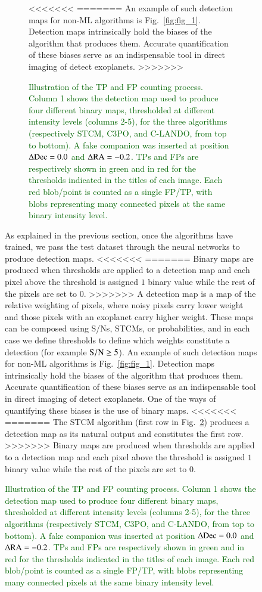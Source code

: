 \documentclass{aa}
\newcommand{\newchange}[1]{\textcolor{darkgreen}{#1}}
\begin{document}
{{{\begin{figure}[t]
\begin{figure}[t]
    \caption{\newchange{Illustration of the TP and FP counting process. Column 1 shows the detection map used to produce four different binary maps, thresholded at different intensity levels (columns 2-5), for the three algorithms (respectively STCM, C3PO, and C-LANDO, from top to bottom). A fake companion was inserted at position $\Delta{\rm Dec}=0.0$ and $\Delta{\rm RA} = -0.2$. TPs and FPs are respectively shown in green and in red for the thresholds indicated in the titles of each image. Each red blob/point is counted as a single FP/TP, with blobs representing many connected pixels at the same binary intensity level.}}
    \label{fig:sample_detmaps}
<<<<<<<
=======
An example of such detection maps for non-ML algorithms is Fig.~\ref{fig:fig_1}.
Detection maps intrinsically hold the biases of the algorithm that produces them. Accurate quantification of these biases serve as an indispensable tool in direct imaging of detect exoplanets.
>>>>>>>
\end{figure}

As explained in the previous section, once the algorithms have trained, we pass the test dataset through the neural networks to produce detection maps.
<<<<<<<
=======
Binary maps are produced when thresholds are applied to a detection map and each pixel above the threshold is assigned $1$ binary value while the rest of the pixels are set to $0$.
>>>>>>>
A detection map is a map of the relative weighting of pixels, where noisy pixels carry lower weight and those pixels with an exoplanet carry higher weight.
These maps can be composed using S/Ns, STCMs, or probabilities, and in each case we define thresholds to define which weights constitute a detection (for example $\rm{S/N}\ge 5$).
An example of such detection maps for non-ML algorithms is Fig.~\ref{fig:fig_1}.
Detection maps intrinsically hold the biases of the algorithm that produces them. Accurate quantification of these biases serve as an indispensable tool in direct imaging of detect exoplanets.
One of the ways of quantifying these biases is the use of  binary maps.
<<<<<<<
=======
The STCM algorithm (first row in Fig.~\ref{fig:sample_detmaps}) produces a detection map as its natural output and constitutes the first row.
>>>>>>>
Binary maps are produced when thresholds are applied to a detection map and each pixel above the threshold is assigned $1$ binary value while the rest of the pixels are set to $0$.


\end{figure}}}}
\end{document}
